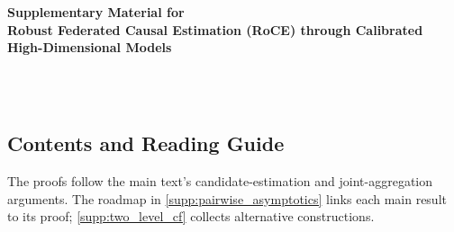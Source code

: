 \documentclass[12pt]{article}
\begin{document}
\def\spacingset#1{\renewcommand{\baselinestretch}{#1}\small\normalsize}
\spacingset{1.8}
\fi
\begingroup
\spacingset{1.1}
\begin{center}
{\large\bfseries Supplementary Material for\\
Robust Federated Causal Estimation (RoCE) through Calibrated High-Dimensional Models\par}
\ifFACEHDSTANDALONE
{}\anon
\medskip
{\small\FACEHDAuthors\\[0.3em]
\FACEHDAffiliationLineOne\\\FACEHDAffiliationLineTwo\par}
\fi
\fi
\end{center}
\endgroup
\FACEHDResetSupplementCounters
\providecommand{\suppcontentsline}[2]{%
  \noindent\hyperref[#1]{\makebox[3.8em][l]{\ref*{#1}}#2}%
  \dotfill\hyperref[#1]{\pageref*{#1}}\par}
\providecommand{\suppsubcontentsline}[2]{%
  \noindent\hspace*{1.5em}\hyperref[#1]{\makebox[4.8em][l]{\ref*{#1}}#2}%
  \dotfill\hyperref[#1]{\pageref*{#1}}\par}
\begingroup
\spacingset{1}
\small
\setlength{\parskip}{0pt}
\subsection*{Contents and Reading Guide}
The proofs follow the main text's candidate-estimation and joint-aggregation arguments. The roadmap in \cref{supp:pairwise_asymptotics} links each main result to its proof; \cref{supp:two_level_cf} collects alternative constructions.
\end{document}
